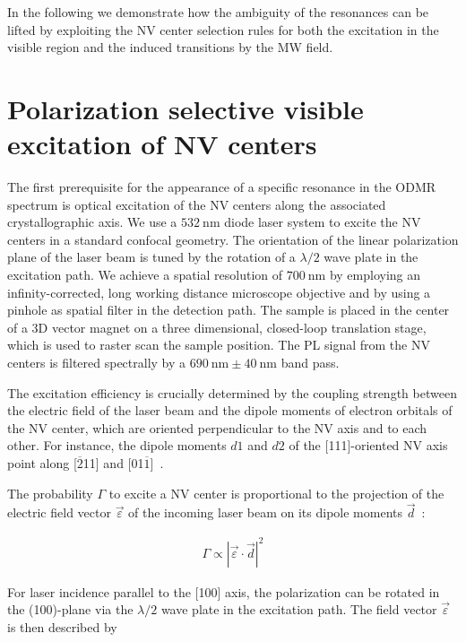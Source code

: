\documentclass[
 reprint,
 amsmath,
 amssymb,
aps,
 prb,
showpacs
]{revtex4-1}
\begin{document}
In the following we demonstrate how the ambiguity of the resonances can be lifted by exploiting the NV center selection rules for both the excitation in the visible region and the induced transitions by the MW field. 

\section{Polarization selective visible excitation of NV centers}

The first prerequisite for the appearance of a specific resonance in the ODMR spectrum is optical excitation of the NV centers along the associated crystallographic axis. We use a $\SI{532}{\nano\meter}$ diode laser system to excite the NV centers in a standard confocal geometry. The orientation of the linear polarization plane of the laser beam is tuned by the rotation of a $\lambda / 2$ wave plate in the excitation path. We achieve a spatial resolution of $\SI{700}{\nano\meter}$ by employing an infinity-corrected, long working distance microscope objective and by using a pinhole as spatial filter in the detection path. The sample is placed in the center of a 3D vector magnet on a three dimensional, closed-loop translation stage, which is used to raster scan the sample position. The PL signal from the NV centers is filtered spectrally by a $\SI{690}{\nano\meter} \pm \SI{40}{\nano\meter}$ band pass. 

The excitation efficiency is crucially determined by the coupling strength between the electric field of the laser beam and the dipole moments of electron orbitals of the NV center, which are oriented perpendicular to the NV axis and to each other. For instance, the dipole moments $d1$ and $d2$ of the [111]-oriented NV axis point along [$\overline{2}$11]  and [01$\overline{1}$]~\cite{epstein,PhysRevB.76.165205}.

The probability $\Gamma$ to excite a NV center is proportional to the projection of the electric field vector $\vec{\varepsilon}$ of the incoming laser beam on its dipole moments $\vec{d}$~\cite{gasiorowicz}: 

\begin{align}
\Gamma \propto \left|  \vec{\varepsilon} \cdot \vec{d} \right|^2
\label{eq:fgr}
\end{align}

For laser incidence parallel to the [100] axis, the polarization can be rotated in the (100)-plane via the $\lambda / 2$ wave plate in the excitation path. The field vector $\vec{\varepsilon}$ is then described by
\end{document}
